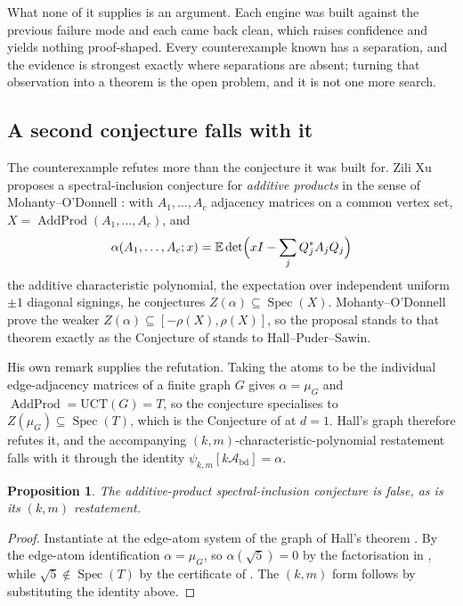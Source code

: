 \documentclass[11pt]{article}
\newtheorem{proposition}[theorem]{Proposition}
\theoremstyle{remark}
\begin{document}
What none of it supplies is an argument. Each engine was built against the previous failure mode
and each came back clean, which raises confidence and yields nothing proof-shaped. Every
counterexample known has a separation, and the evidence is strongest exactly where separations are
absent; turning that observation into a theorem is the open problem, and it is not one more search.

\subsection{A second conjecture falls with it}\label{sec:xu}

The counterexample refutes more than the conjecture it was built for. Zili Xu \cite{Xu}
proposes a spectral-inclusion conjecture for \emph{additive products}
in the sense of Mohanty--O'Donnell \cite{MO}: with $A_1,\dots,A_c$ adjacency matrices on a common
vertex set, $X=\operatorname{AddProd}(A_1,\dots,A_c)$, and
\[
   \alpha(A_1,\dots,A_c;x)=\mathbb E\det\Bigl(xI-\sum_{j}Q_j^{*}A_jQ_j\Bigr)
\]
the additive characteristic polynomial, the expectation over independent uniform $\pm1$ diagonal
signings, he conjectures $Z(\alpha)\subseteq\operatorname{Spec}(X)$. Mohanty--O'Donnell prove the
weaker $Z(\alpha)\subseteq[-\rho(X),\rho(X)]$, so the proposal stands to that theorem exactly as
the Conjecture of \cite{PartI} stands to Hall--Puder--Sawin.

His own remark \cite{Xu} supplies the refutation. Taking the atoms to be the individual edge-adjacency
matrices of a finite graph $G$ gives $\alpha=\mu_G$ and $\operatorname{AddProd}=\mathrm{UCT}(G)=T$,
so the conjecture specialises to $Z(\mu_G)\subseteq\operatorname{Spec}(T)$, which is
the Conjecture of \cite{PartI} at $d=1$. Hall's graph therefore refutes it, and the accompanying
$(k,m)$-characteristic-polynomial restatement falls with it through the identity
$\psi_{k,m}[k\mathcal A_{\mathrm{bd}}]=\alpha$.

\begin{proposition}\label{prop:xu}
The additive-product spectral-inclusion conjecture is false, as is its $(k,m)$ restatement.
\end{proposition}

\begin{proof}
Instantiate at the edge-atom system of the graph of Hall's theorem \cite{HallCE}. By the edge-atom
identification $\alpha=\mu_G$, so $\alpha(\sqrt5)=0$ by the factorisation in \cite{PartI}, while
$\sqrt5\notin\operatorname{Spec}(T)$ by the certificate of \cite{PartI}. The $(k,m)$ form
follows by substituting the identity above.
\end{proof}
\end{document}
